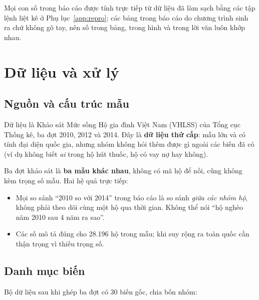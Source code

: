 \documentclass[11pt,a4paper]{article}
\newcommand{\n}[1]{\textbf{#1}}
\newcommand{\tbl}[1]{}
\begin{document}
Mọi con số trong báo cáo được tính trực tiếp từ dữ liệu đã làm sạch bằng các tập lệnh liệt kê ở Phụ lục~\ref{app:repro}; các bảng trong báo cáo do chương trình sinh ra chứ không gõ tay, nên số trong bảng, trong hình và trong lời văn luôn khớp nhau.

\section{Dữ liệu và xử lý}

\subsection{Nguồn và cấu trúc mẫu}
Dữ liệu là Khảo sát Mức sống Hộ gia đình Việt Nam (VHLSS) của Tổng cục Thống kê, ba đợt 2010, 2012 và 2014. Đây là \n{dữ liệu thứ cấp}: mẫu lớn và có tính đại diện quốc gia, nhưng nhóm không hỏi thêm được gì ngoài các biến đã có (ví dụ không biết \emph{ai} trong hộ hút thuốc, hộ có vay nợ hay không).

\begin{table}[H]\centering\small
\caption{Cỡ mẫu theo năm và khu vực}
\tbl{t_sample}
\end{table}

Ba đợt khảo sát là \n{ba mẫu khác nhau}, không có mã hộ để nối, cũng không kèm trọng số mẫu. Hai hệ quả trực tiếp:

\begin{itemize}[leftmargin=1.2em,itemsep=2pt,topsep=2pt]
\item Mọi so sánh “2010 so với 2014” trong báo cáo là so sánh \emph{giữa các nhóm hộ}, không phải theo dõi cùng một hộ qua thời gian. Không thể nói “hộ nghèo năm 2010 sau 4 năm ra sao”.
\item Các số mô tả đúng cho 28.196 hộ trong mẫu; khi suy rộng ra toàn quốc cần thận trọng vì thiếu trọng số.
\end{itemize}

\subsection{Danh mục biến}
Bộ dữ liệu sau khi ghép ba đợt có 30 biến gốc, chia bốn nhóm:
\end{document}
